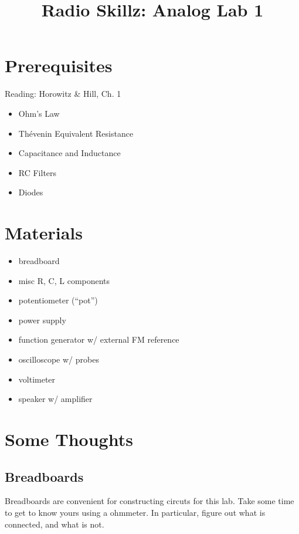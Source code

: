 \documentclass[11pt]{article}
\begin{document}
\title{Radio Skillz: Analog Lab 1}

\maketitle

\section*{Prerequisites}

Reading: Horowitz \& Hill, Ch. 1

\begin{itemize}
\item Ohm's Law
\item Th\'evenin Equivalent Resistance
\item Capacitance and Inductance
\item RC Filters
\item Diodes
\end{itemize}

\section*{Materials}

\begin{itemize}
\item breadboard
\item misc R, C, L components
\item potentiometer (``pot'')
\item power supply
\item function generator w/ external FM reference
\item oscilloscope w/ probes
\item voltimeter
\item speaker w/ amplifier
\end{itemize}

\section*{Some Thoughts}

\subsection*{Breadboards}

Breadboards are convenient for constructing circuts for this lab.  Take some time to get to know yours
using a ohmmeter.  In particular, figure out what is connected, and what is not.
\end{document}
